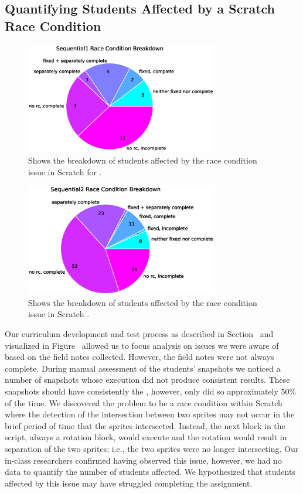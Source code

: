 \subsection{Quantifying Students Affected by a Scratch Race Condition}

\begin{figure}[!t]
\centering \includegraphics[width=3.3in]{graphs/race_condition_Sequential1.eps}
\caption{Shows the breakdown of students affected by the race condition issue
  in Scratch for \sone{}.}
\end{figure}

\begin{figure}[!t]
\centering \includegraphics[width=3.3in]{graphs/race_condition_Sequential2.eps}
\caption{Shows the breakdown of students affected by the race condition issue
  in Scratch \stwo{}.}
\end{figure}

Our curriculum development and test process as described in
Section~ and visualized in Figure~
allowed us to focus analysis on issues we were aware of based on the field
notes collected. However, the field notes were not always complete. During
manual assessment of the students' snapshots we noticed a number of snapshots
whose execution did not produce consistent results. These snapshots should have
consistently \caught{} the \zebra{}, however, only did so approximately 50\% of
the time. We discovered the problem to be a race condition within Scratch where
the detection of the intersection between two sprites may not occur in the
brief period of time that the sprites intersected. Instead, the next block in
the script, always a rotation block, would execute and the rotation would
result in separation of the two sprites; i.e., the two sprites were no longer
intersecting. Our in-class researchers confirmed having observed this issue,
however, we had no data to quantify the number of students affected. We
hypothesized that students affected by this issue may have struggled completing
the assignment.

